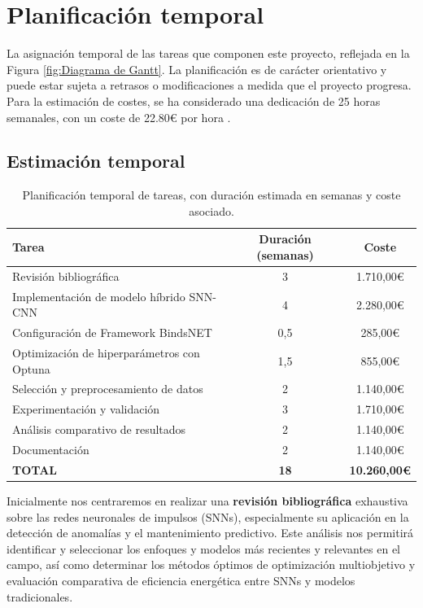 \section{Planificación temporal}

La asignación temporal de las tareas que componen este proyecto, reflejada en la Figura \ref{fig:Diagrama de Gantt}. La planificación es de carácter orientativo y puede estar sujeta a retrasos o modificaciones a medida que el proyecto progresa. Para la estimación de costes, se ha considerado una dedicación de 25 horas semanales, con un coste de 22.80€ por hora \cite{Talent.com_2024}.

\subsection{Estimación temporal}

\begin{table}[htbp]
\centering
\begin{tabular}{lcc}
\hline \hline
\textbf{Tarea} & \textbf{Duración (semanas)} & \textbf{Coste} \\
\hline
Revisión bibliográfica & 3 & 1.710,00€ \\
Implementación de modelo híbrido SNN-CNN & 4 & 2.280,00€ \\
Configuración de Framework BindsNET & 0,5 & 285,00€ \\
Optimización de hiperparámetros con Optuna & 1,5 & 855,00€ \\
Selección y preprocesamiento de datos & 2 & 1.140,00€ \\
Experimentación y validación & 3 & 1.710,00€ \\
Análisis comparativo de resultados & 2 & 1.140,00€ \\
Documentación  & 2 & 1.140,00€ \\
\hline
\textbf{TOTAL} & \textbf{18} & \textbf{10.260,00€} \\
\hline \hline
\end{tabular}
\caption{Planificación temporal de tareas, con duración estimada en semanas y coste asociado.}
\label{tab:planificacion_tareas}
\end{table}

Inicialmente nos centraremos en realizar una \textbf{revisión bibliográfica} exhaustiva sobre las redes neuronales de impulsos (SNNs), especialmente su aplicación en la detección de anomalías y el mantenimiento predictivo. Este análisis nos permitirá identificar y seleccionar los enfoques y modelos más recientes y relevantes en el campo, así como determinar los métodos óptimos de optimización multiobjetivo y evaluación comparativa de eficiencia energética entre SNNs y modelos tradicionales.

